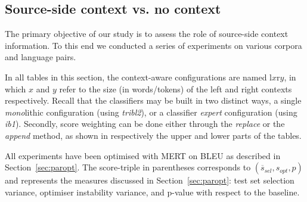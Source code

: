 \subsection{Source-side context vs. no context}
\label{sec:results1}

The primary objective of our study is to assess the role of source-side context
information. To this end we conducted a series of experiments on various
corpora and language pairs. 

In all tables in this section, the context-aware configurations are named
l$x$r$y$, in which $x$ and $y$ refer to the size (in words/tokens) of the left and right contexts
respectively.  Recall that the classifiers may be built in two distinct ways, a
single \emph{mono}lithic configuration (using \emph{tribl2}), or a classifier
\emph{expert} configuration (using \emph{ib1}).  Secondly, score weighting can
be done either through the \emph{replace}  or the \emph{append} method, as
shown in respectively the upper and lower parts of the tables. 

All experiments have been optimised with MERT on BLEU as described in
Section~\ref{sec:paropt}.  The score-triple in parentheses corresponds to
$(\overline{s}_{sel},s_{opt},p)$ and represents the measures discussed in
Section~\ref{sec:paropt}: test set selection variance, optimiser instability
variance, and p-value with respect to the baseline.

